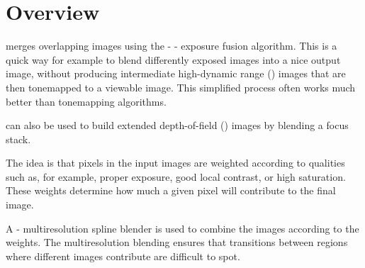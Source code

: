 

\chapter[Overview]{Overview
  \label{sec:overview}
  }

\begin{sloppypar}
  \App{} merges overlapping images using the
  -%
  -%
  exposure fusion algorithm.\footnotemark{}
  This is a quick way for example to blend differently exposed images
  into a nice output image, without producing intermediate
  high-dynamic range
  () images
  that are then tonemapped to a viewable image.  This simplified
  process often works much better than tonemapping algorithms.
\end{sloppypar}

\App{} can also be used to build extended
depth-of-field
() images by
blending a focus stack.

The idea is that pixels in the input images are weighted according to
qualities such as, for example, proper exposure, good local contrast,
or high saturation.  These weights determine how much a given pixel
will contribute to the final image.

A -%
multiresolution spline%
 blender\footnotemark{} is used to combine
the images according to the weights.  The multiresolution blending
ensures that transitions between regions where different images
contribute are difficult to spot.%


